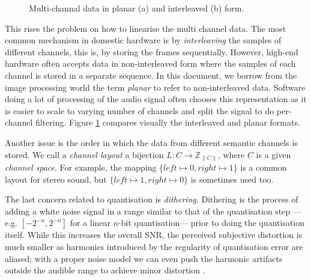 \begin{figure}[h]
  \centering
  \;
  \caption{Multi-channal data in planar (a) and interleaved (b) form.}
  \label{fig:interleaving}
\end{figure}

This rises the problem on how to linearise the multi channel data. The
most common mechanism in domestic hardware is by \emph{interleaving}
the samples of different channels, this is, by storing the frames
sequentially. However, high-end hardware often accepts data in
non-interleaved form where the samples of each channel is stored in a
separate sequence. In this document, we borrow from the image
processing world the term \emph{planar} to refer to non-interleaved
data. Software doing a lot of processing of the audio signal often
chooses this representation as it is easier to scale to varying number
of channels and split the signal to do per-channel filtering. Figure
\ref{fig:interleaving} compares visually the interleaved and planar
formats.

Another issue is the order in which the data from different semantic
channels is stored. We call a \emph{channel layout} a bijection $L : C
\rightarrow \mathbb{Z}_{\|C\|}$, where $C$ is a given \emph{channel
  space}. For example, the mapping $\{ left
\mapsto 0, right \mapsto 1 \}$ is a common layout for stereo sound,
but $\{ left \mapsto 1, right \mapsto 0 \}$ is sometimes used too.

The last concern related to quantisation is
\emph{dithering}. Dithering is the process of adding a white noise
signal in a range similar to that of the quantisation step
---e.g. $[-2^{-n}, 2^{-n}]$ for a linear $n$-bit quantisation--- prior
to doing the quantisation itself. While this increases the overall
SNR, the perceived subjective distortion is much smaller as harmonics
introduced by the regularity of quantisation error are aliased; with a
proper noise model we can even push the harmonic artifacts outside the
audible range to achieve minor distortion \cite{vanderkooy87dither,
  lipshitz91minimally}.


